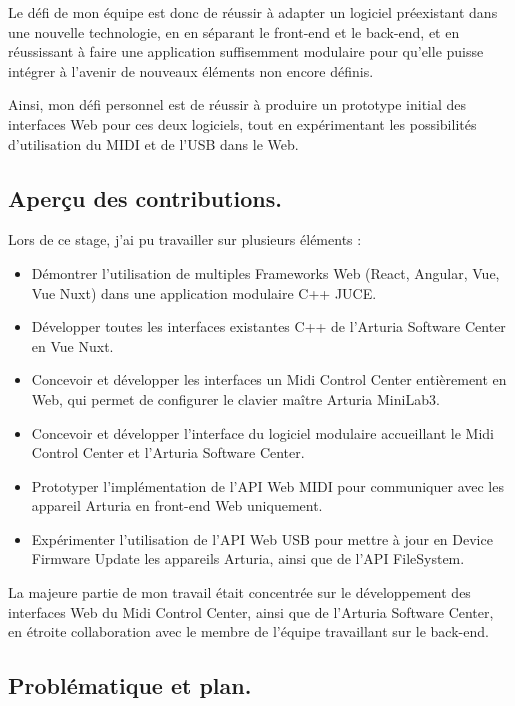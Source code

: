 \documentclass[francais]{rapportPFE}  %
\begin{document}
Le défi de mon équipe est donc de réussir à adapter un logiciel préexistant dans une nouvelle technologie, en en séparant le front-end et le back-end, et en réussissant à faire une application suffisemment modulaire pour qu'elle puisse intégrer à l'avenir de nouveaux éléments non encore définis.

Ainsi, mon défi personnel est de réussir à produire un prototype initial des interfaces Web pour ces deux logiciels, tout en expérimentant les possibilités d'utilisation du MIDI et de l'USB dans le Web.



\subsection{Aperçu des contributions.}
Lors de ce stage, j'ai pu travailler sur plusieurs éléments : 
\begin{itemize}
    \setlength\itemsep{0em}
    \item Démontrer l'utilisation de multiples Frameworks Web (React, Angular, Vue, Vue Nuxt) dans une application modulaire C++ JUCE.
    \item Développer toutes les interfaces existantes C++ de l'Arturia Software Center en Vue Nuxt.
    \item Concevoir et développer les interfaces un Midi Control Center entièrement en Web, qui permet de configurer le clavier maître Arturia MiniLab3.
    \item Concevoir et développer l'interface du logiciel modulaire accueillant le Midi Control Center et l'Arturia Software Center.
    \item Prototyper l'implémentation de l'API Web MIDI pour communiquer avec les appareil Arturia en front-end Web uniquement.
    \item Expérimenter l'utilisation de l'API Web USB pour mettre à jour en Device Firmware Update les appareils Arturia, ainsi que de l'API FileSystem.
\end{itemize}
La majeure partie de mon travail était concentrée sur le développement des interfaces Web du Midi Control Center, ainsi que de l'Arturia Software Center, en étroite collaboration avec le membre de l'équipe travaillant sur le back-end. 

\subsection{Problématique et plan.}
\end{document}
